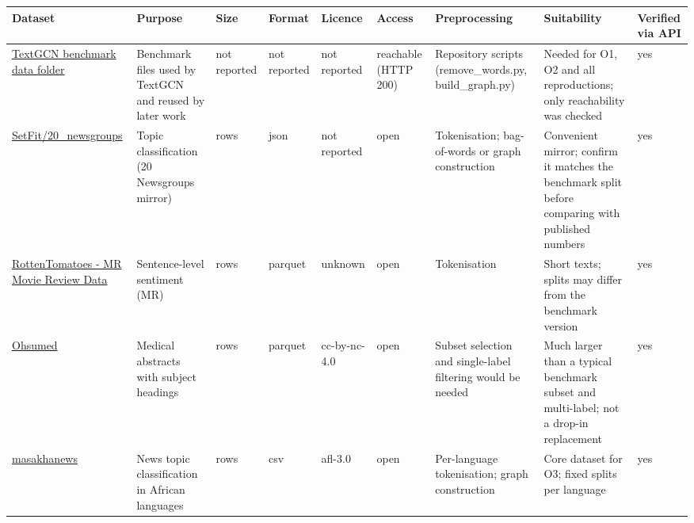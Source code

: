 \documentclass[11pt,a4paper]{article}
\begin{document}
{\small
\begin{longtable}{>{\raggedright\arraybackslash}p{}>{\raggedright\arraybackslash}p{}>{\raggedright\arraybackslash}p{}>{\raggedright\arraybackslash}p{}>{\raggedright\arraybackslash}p{}>{\raggedright\arraybackslash}p{}>{\raggedright\arraybackslash}p{}>{\raggedright\arraybackslash}p{}>{\raggedright\arraybackslash}p{}}
\toprule
\textbf{Dataset} & \textbf{Purpose} & \textbf{Size} & \textbf{Format} & \textbf{Licence} & \textbf{Access} & \textbf{Preprocessing} & \textbf{Suitability} & \textbf{Verified via API} \\
\midrule
\endhead
\href{https://github.com/yao8839836/text_gcn/tree/master/data}{TextGCN benchmark data folder} & Benchmark files used by TextGCN and reused by later work & not reported & not reported & not reported & reachable (HTTP 200) & Repository scripts (remove\_words.py, build\_graph.py) & Needed for O1, O2 and all reproductions; only reachability was checked & yes \\
\href{https://huggingface.co/datasets/SetFit/20_newsgroups}{SetFit/20\_newsgroups} & Topic classification (20 Newsgroups mirror) & 18846 rows & json & not reported & open & Tokenisation; bag-of-words or graph construction & Convenient mirror; confirm it matches the benchmark split before comparing with published numbers & yes \\
\href{https://huggingface.co/datasets/cornell-movie-review-data/rotten_tomatoes}{RottenTomatoes - MR Movie Review Data} & Sentence-level sentiment (MR) & 10662 rows & parquet & unknown & open & Tokenisation & Short texts; splits may differ from the benchmark version & yes \\
\href{https://huggingface.co/datasets/community-datasets/ohsumed}{Ohsumed} & Medical abstracts with subject headings & 348564 rows & parquet & cc-by-nc-4.0 & open & Subset selection and single-label filtering would be needed & Much larger than a typical benchmark subset and multi-label; not a drop-in replacement & yes \\
\href{https://huggingface.co/datasets/masakhane/masakhanews}{masakhanews} & News topic classification in African languages & 31088 rows & csv & afl-3.0 & open & Per-language tokenisation; graph construction & Core dataset for O3; fixed splits per language & yes \\
\bottomrule
\end{longtable}
}
\end{document}
